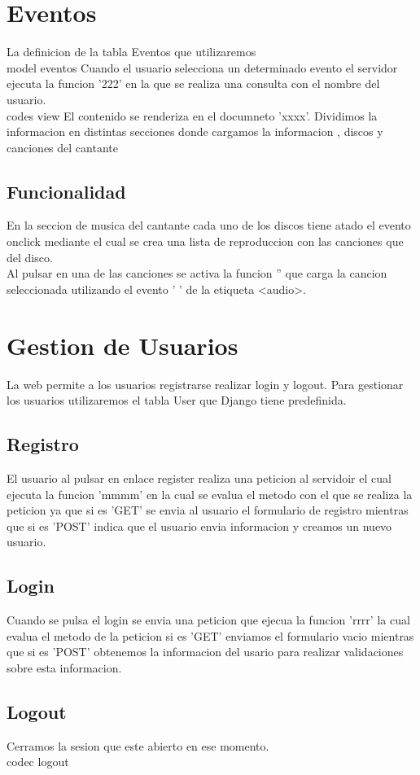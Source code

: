 \section{Eventos}
La definicion de la tabla Eventos que utilizaremos 
\\model eventos
Cuando el usuario selecciona un determinado evento el servidor ejecuta la funcion '222' en la que se realiza una consulta con el nombre del usuario.
\\ codes view
El contenido se renderiza en el documneto 'xxxx'. Dividimos la informacion en distintas secciones  donde cargamos la informacion , discos y canciones del cantante
\subsection{Funcionalidad}
En la seccion de musica del cantante cada uno de los discos tiene atado el evento onclick mediante el cual se crea una lista de reproduccion con las canciones que del disco. 
\\Al pulsar en una de las canciones se activa la funcion '' que carga la cancion seleccionada utilizando el evento ' ' de la etiqueta <audio>.

\section{Gestion de Usuarios}
La web permite a los usuarios registrarse  realizar login y logout. Para gestionar los usuarios utilizaremos el tabla User que Django tiene predefinida.
\subsection{Registro}
El usuario al pulsar en enlace register realiza una peticion al servidoir el cual ejecuta la funcion 'mmmm' en la cual se evalua el metodo con el que se realiza la peticion ya que si es 'GET' se envia al usuario el formulario de registro mientras que si es 'POST' indica que el usuario envia informacion y  creamos un nuevo usuario.
\subsection{Login}
Cuando se pulsa el  login  se envia una peticion que ejecua la funcion 'rrrr' la cual evalua el metodo de la peticion si es 'GET' enviamos el formulario vacio mientras que si es 'POST' obtenemos la informacion del  usario para realizar validaciones sobre esta informacion.
\subsection{Logout}
Cerramos la sesion que este abierto en ese momento.
\\codec logout 
